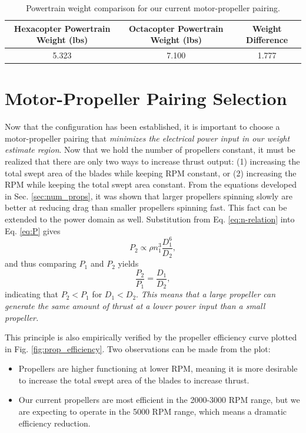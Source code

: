 \documentclass{article}
\begin{document}
\begin{table}[h]
    \centering
    \begin{tabular}{|c|c|c|}
        \hline
        \rowcolor{lightgray} %
        \textbf{Hexacopter Powertrain Weight (lbs)} & \textbf{Octacopter Powertrain Weight (lbs)} & \textbf{Weight Difference} \\
        \hline
        5.323 & 7.100 & 1.777 \\
        \hline
    \end{tabular}
    \caption{Powertrain weight comparison for our current motor-propeller pairing.}
    \label{tab:powertrain_weight}
\end{table}

\section{Motor-Propeller Pairing Selection}\label{sec:motor-props}
Now that the configuration has been established, it is important to choose a motor-propeller pairing that \textit{minimizes the electrical power input in our weight estimate region}. Now that we hold the number of propellers constant, it must be realized that there are only two ways to increase thrust output: (1) increasing the total swept area of the blades while keeping RPM constant, or (2) increasing the RPM while keeping the total swept area constant. From the equations developed in Sec. \ref{sec:num_props}, it was shown that larger propellers spinning slowly are better at reducing drag than smaller propellers spinning fast. This fact can be extended to the power domain as well. Substitution from Eq. \ref{eq:n-relation} into Eq. \ref{eq:P} gives
\begin{equation}
    P_2 \propto \rho n_1^3 \frac{D_1^6}{D_2},
\end{equation} 
and thus comparing $P_1$ and $P_2$ yields
\begin{equation}
    \frac{P_2}{P_1} = \frac{D_1}{D_2},
\end{equation}
indicating that $P_2 < P_1$ for $D_1 < D_2$. \textit{This means that a large propeller can generate the same amount of thrust at a lower power input than a small propeller.}

This principle is also empirically verified by the propeller efficiency curve plotted in Fig. \ref{fig:prop_efficiency}. Two observations can be made from the plot:
\begin{itemize}
    \item Propellers are higher functioning at lower RPM, meaning it is more desirable to increase the total swept area of the blades to increase thrust.
    \item Our current propellers are most efficient in the 2000-3000 RPM range, but we are expecting to operate in the 5000 RPM range, which means a dramatic efficiency reduction.
\end{itemize}
\end{document}
